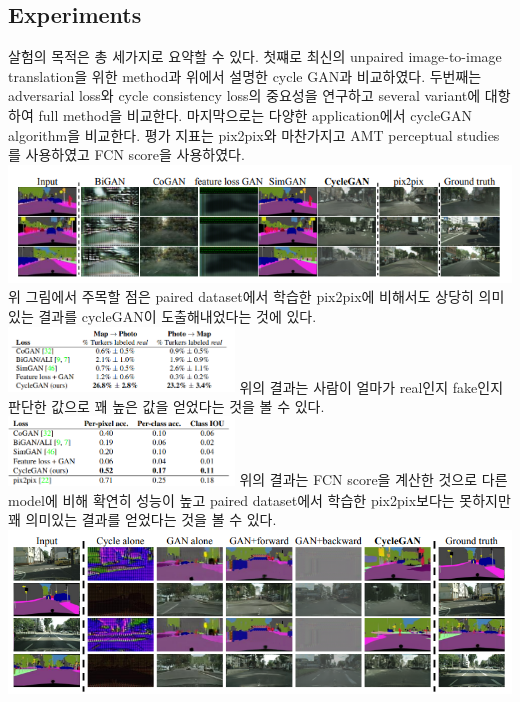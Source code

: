 \documentclass[extendedabs]{bmvc2k}
\begin{document}
\subsection{Experiments}
살험의 목적은 총 세가지로 요약할 수 있다. 첫쨰로 최신의 unpaired image-to-image translation을 위한 method과 위에서 설명한 cycle GAN과 비교하였다.
두번째는 adversarial loss와 cycle consistency loss의 중요성을 연구하고 several variant에 대항하여 full method을 비교한다. 마지막으로는 다양한 application에서 cycleGAN algorithm을 비교한다.
평가 지표는 pix2pix와 마찬가지고 AMT perceptual studies를 사용하였고 FCN score을 사용하였다.  
\newline  \includegraphics[width=\linewidth]{images/06_cycleGAN.PNG}
위 그림에서 주목할 점은 paired dataset에서 학습한 pix2pix에 비해서도 상당히 의미있는 결과를 cycleGAN이 도출해내었다는 것에 있다.
\newline  \includegraphics[width=6cm]{images/07_cycleGAN.PNG}
\newline 위의 결과는 사람이 얼마가 real인지 fake인지 판단한 값으로 꽤 높은 값을 얻었다는 것을 볼 수 있다.
\newline  \includegraphics[width=6cm]{images/08_cycleGAN.PNG}
\newline 위의 결과는 FCN score을 계산한 것으로 다른 model에 비해 확연히 성능이 높고 paired dataset에서 학습한 pix2pix보다는 못하지만 꽤 의미있는 결과를 얻었다는 것을 볼 수 있다.
\newline  \includegraphics[width=\linewidth]{images/09_cycleGAN.PNG}
\end{document}

